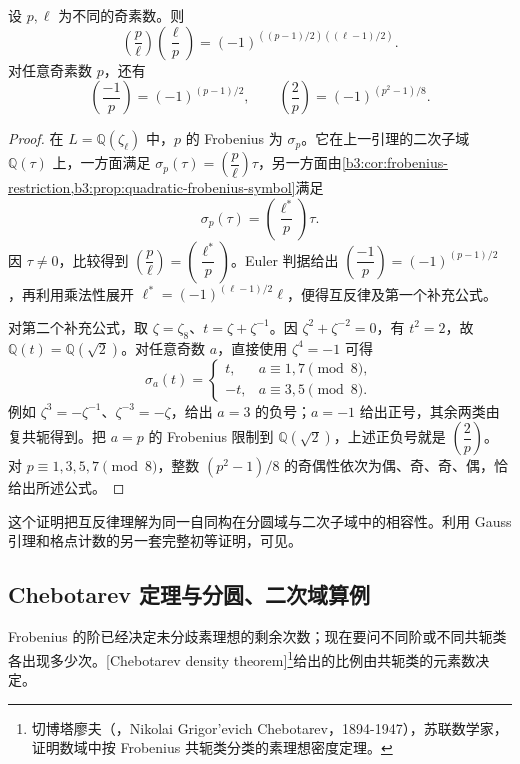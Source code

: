 \begin{theorem}[二次互反律及补充公式]\label{b3:thm:quadratic-reciprocity}
	设 \(p,\ell\) 为不同的奇素数。则
	\[
		\left(\dfrac p\ell\right)\left(\dfrac\ell p\right)
		=(-1)^{((p-1)/2)((\ell-1)/2)}.
	\]
	对任意奇素数 \(p\)，还有
	\[
		\left(\dfrac{-1}p\right)=(-1)^{(p-1)/2},\qquad
		\left(\dfrac2p\right)=(-1)^{(p^2-1)/8}.
	\]
\end{theorem}
\begin{proof}
	在 \(L=\mathbb Q(\zeta_\ell)\) 中，\(p\) 的 Frobenius 为 \(\sigma_p\)。它在上一引理的二次子域 \(\mathbb Q(\tau)\) 上，一方面满足 \(\sigma_p(\tau)=\left(\dfrac p\ell\right)\tau\)，另一方面由\cref{b3:cor:frobenius-restriction,b3:prop:quadratic-frobenius-symbol}满足
	\[
		\sigma_p(\tau)=\left(\dfrac{\ell^*}p\right)\tau.
	\]
	因 \(\tau\ne0\)，比较得到 \(\left(\dfrac p\ell\right)=\left(\dfrac{\ell^*}p\right)\)。Euler 判据给出 \(\left(\dfrac{-1}p\right)=(-1)^{(p-1)/2}\)，再利用乘法性展开 \(\ell^*=(-1)^{(\ell-1)/2}\ell\)，便得互反律及第一个补充公式。

	对第二个补充公式，取 \(\zeta=\zeta_8\)、\(t=\zeta+\zeta^{-1}\)。因 \(\zeta^2+\zeta^{-2}=0\)，有 \(t^2=2\)，故 \(\mathbb Q(t)=\mathbb Q(\sqrt2)\)。对任意奇数 \(a\)，直接使用 \(\zeta^4=-1\) 可得
	\[
		\sigma_a(t)=
		\begin{cases}
			t,&a\equiv1,7\pmod8,\\
			-t,&a\equiv3,5\pmod8.
		\end{cases}
	\]
	例如 \(\zeta^3=-\zeta^{-1}\)、\(\zeta^{-3}=-\zeta\)，给出 \(a=3\) 的负号；\(a=-1\) 给出正号，其余两类由复共轭得到。把 \(a=p\) 的 Frobenius 限制到 \(\mathbb Q(\sqrt2)\)，上述正负号就是 \(\left(\dfrac2p\right)\)。对 \(p\equiv1,3,5,7\pmod8\)，整数 \((p^2-1)/8\) 的奇偶性依次为偶、奇、奇、偶，恰给出所述公式。
\end{proof}

这个证明把互反律理解为同一自同构在分圆域与二次子域中的相容性。利用 Gauss 引理和格点计数的另一套完整初等证明，可见\cite[Section 12.1, Theorems 12.1--12.4, pp. 342--346]{Shoup2008NumberTheoryAlgebra}。

\subsection{Chebotarev 定理与分圆、二次域算例}
\label{b3:subsec:A05:02}

Frobenius 的阶已经决定未分歧素理想的剩余次数；现在要问不同阶或不同共轭类各出现多少次。[Chebotarev density theorem]\footnote{切博塔廖夫（，Nikolai Grigor'evich Chebotarev，1894-1947），苏联数学家，证明数域中按 Frobenius 共轭类分类的素理想密度定理。}给出的比例由共轭类的元素数决定。

